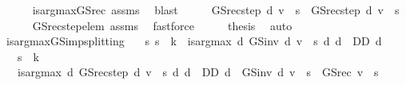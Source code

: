 \begin{isabellebody}
\ \ \ \ \isamarkupfalse%
\ is{\isacharunderscore}{\kern0pt}arg{\isacharunderscore}{\kern0pt}max{\isacharunderscore}{\kern0pt}GS{\isacharunderscore}{\kern0pt}rec{\isacharprime}{\kern0pt}\ assms{\isacharparenleft}{\kern0pt}{}{\isacharparenright}{\kern0pt}\ \isamarkupfalse%
\ blast\isanewline
\ \ \isamarkupfalse%
\ \isamarkupfalse%
\ {\isachardoublequoteopen}GS{\isacharunderscore}{\kern0pt}rec{\isacharunderscore}{\kern0pt}step\ d\ v\ {\isachardollar}{\kern0pt}\ s\ {\isacharequal}{\kern0pt}\ GS{\isacharunderscore}{\kern0pt}rec{\isacharunderscore}{\kern0pt}step\ d{\isacharprime}{\kern0pt}\ v\ {\isachardollar}{\kern0pt}\ s{\isachardoublequoteclose}\isanewline
\ \ \ \ \isamarkupfalse%
\ GS{\isacharunderscore}{\kern0pt}rec{\isacharunderscore}{\kern0pt}step{\isacharunderscore}{\kern0pt}elem\ assms{\isacharparenleft}{\kern0pt}{}{\isacharparenright}{\kern0pt}\ \isamarkupfalse%
\ fastforce\isanewline
\ \ \isamarkupfalse%
\ \isamarkupfalse%
\ {\isacharquery}{\kern0pt}thesis\ \isamarkupfalse%
\ auto\isanewline
{}\isamarkupfalse%
%
\endisatagproof
{\isafoldproof}%
%
\isadelimproof
\isanewline
%
\endisadelimproof
\isanewline
{}\isamarkupfalse%
\ is{\isacharunderscore}{\kern0pt}arg{\isacharunderscore}{\kern0pt}max{\isacharunderscore}{\kern0pt}GS{\isacharunderscore}{\kern0pt}imp{\isacharunderscore}{\kern0pt}splitting{\isacharprime}{\kern0pt}{\isacharprime}{\kern0pt}{\isacharcolon}{\kern0pt}\isanewline
\ \ \ {\isachardoublequoteopen}{\isasymAnd}s{\isachardot}{\kern0pt}\ s\ {\isasymle}\ k\ {\isasymLongrightarrow}\ is{\isacharunderscore}{\kern0pt}arg{\isacharunderscore}{\kern0pt}max\ {\isacharparenleft}{\kern0pt}{\isasymlambda}d{\isachardot}{\kern0pt}\ GS{\isacharunderscore}{\kern0pt}inv\ d\ v\ {\isachardollar}{\kern0pt}\ s{\isacharparenright}{\kern0pt}\ {\isacharparenleft}{\kern0pt}{\isasymlambda}d{\isachardot}{\kern0pt}\ d\ {\isasymin}\ D\isactrlsub D{\isacharparenright}{\kern0pt}\ d{\isachardoublequoteclose}\isanewline
\ \ \ {\isachardoublequoteopen}s\ {\isasymle}\ k{\isachardoublequoteclose}\isanewline
\ \ \ {\isachardoublequoteopen}is{\isacharunderscore}{\kern0pt}arg{\isacharunderscore}{\kern0pt}max\ {\isacharparenleft}{\kern0pt}{\isasymlambda}d{\isachardot}{\kern0pt}\ GS{\isacharunderscore}{\kern0pt}rec{\isacharunderscore}{\kern0pt}step\ d\ v\ {\isachardollar}{\kern0pt}\ s{\isacharparenright}{\kern0pt}\ {\isacharparenleft}{\kern0pt}{\isasymlambda}d{\isachardot}{\kern0pt}\ d\ {\isasymin}\ D\isactrlsub D{\isacharparenright}{\kern0pt}\ d\ {\isasymand}\ GS{\isacharunderscore}{\kern0pt}inv\ d\ v\ {\isachardollar}{\kern0pt}\ s\ {\isacharequal}{\kern0pt}\ GS{\isacharunderscore}{\kern0pt}rec\ v\ {\isachardollar}{\kern0pt}\ s{\isachardoublequoteclose}\isanewline

\end{isabellebody}
